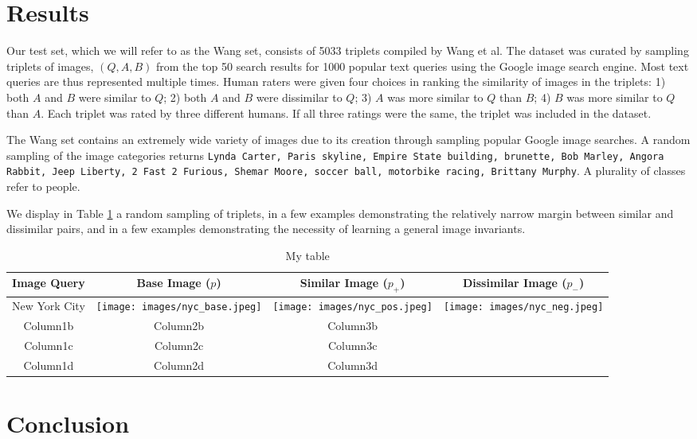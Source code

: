 
\section{Results}

Our test set, which we will refer to as the Wang set, consists of 5033 triplets compiled by Wang et al.\cite{wang2014learning} The dataset was curated by sampling triplets of images, $(Q, A, B)$ from the top 50 search results for 1000 popular text queries using the Google image search engine. Most text queries are thus represented multiple times. Human raters were given four choices in ranking the similarity of images in the triplets: 1) both $A$ and $B$ were similar to $Q$; 2) both $A$ and $B$ were dissimilar to $Q$; 3) $A$ was more similar to $Q$ than $B$; 4) $B$ was more similar to $Q$ than $A$. Each triplet was rated by three different humans. If all three ratings were the same, the triplet was included in the dataset.

The Wang set contains an extremely wide variety of images due to its creation through sampling popular Google image searches. A random sampling of the image categories returns \texttt{\justify Lynda Carter, Paris skyline, Empire State building, brunette, Bob Marley, Angora Rabbit, Jeep Liberty, 2 Fast 2 Furious, Shemar Moore, soccer ball, motorbike racing, Brittany Murphy}. A plurality of classes refer to people.

We display in Table \ref{table:random_triplets} a random sampling of triplets, in a few examples demonstrating the relatively narrow margin between similar and dissimilar pairs, and in  a few examples demonstrating the necessity of learning a general image invariants.

\begin{table}
\begin{tabular}{*{4}{c}}
\toprule
\bfseries Image Query & \bfseries Base Image ($p$) & \bfseries Similar Image ($p_+$) & \bfseries Dissimilar Image ($p_-$) \\
\midrule
\centering New York City & \texttt{[image: images/nyc\_base.jpeg]} & \texttt{[image: images/nyc\_pos.jpeg]} & \texttt{[image: images/nyc\_neg.jpeg]}\\
Column1b & Column2b & Column3b & \\
Column1c & Column2c & Column3c & \\
Column1d & Column2d & Column3d & \\
\bottomrule
\end{tabular}
\caption{My table}
\label{table:random_triplets}
\end{table}

\section{Conclusion}